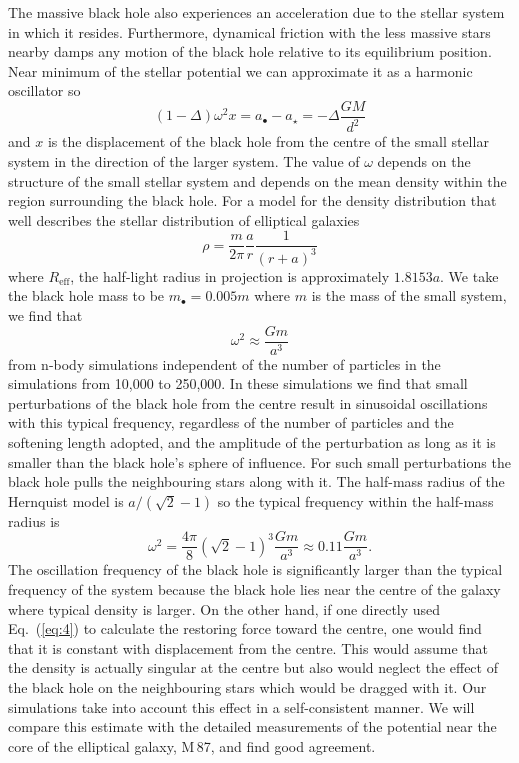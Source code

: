 \documentclass[useAMS,usenatbib]{mn2e}
\begin{document}
The massive black hole also experiences an acceleration due to the
stellar system in which it resides.  Furthermore, dynamical friction
with the less massive stars nearby damps any motion of the black hole
relative to its equilibrium position.  Near minimum of the stellar
potential we can approximate it as a harmonic oscillator so
\begin{equation}
  \left (1 - \Delta \right) \omega^2 x
   = a_\bullet - a_\star = -\Delta \frac{GM}{d^2}
  \label{eq:3}
\end{equation}
and $x$ is the displacement of the black hole from the centre of the
small stellar system in the direction of the larger system.  The value
of $\omega$ depends on the structure of the small stellar system and
depends on the mean density within the region surrounding the black
hole.  For a \citet{1990ApJ...356..359H} model
for the density distribution that well describes the stellar
distribution of elliptical galaxies
\begin{equation}
  \rho = \frac{m}{2\pi} \frac{a}{r} \frac{1}{(r+a)^3}
  \label{eq:4}
\end{equation}
where $R_\mathrm{eff}$, the half-light radius in projection is
approximately $1.8153 a$.  We take the black hole mass to be
$m_\bullet = 0.005 m$ where $m$ is the mass of the small system, we
find that
\begin{equation}
  \omega^2 \approx \frac{Gm}{a^3}
  \label{eq:5}
\end{equation}
from n-body simulations independent of the number of particles in the
simulations from 10,000 to 250,000.  In these simulations we find that
small perturbations of the black hole from the centre result in
sinusoidal oscillations with this typical frequency, regardless of the
number of particles and the softening length adopted, and the
amplitude of the perturbation as long as it is smaller than the black
hole's sphere of influence.  For such small perturbations the black
hole pulls the neighbouring stars along with it. The half-mass radius
of the Hernquist model is $a/(\sqrt{2}-1)$ so the typical frequency
within the half-mass radius is
\begin{equation}
  \omega^2 = \frac{4\pi}{8} (\sqrt{2}-1)^3 \frac{G m}{a^3} \approx
  0.11 \frac{Gm}{a^3}.
  \label{eq:6}
\end{equation}
The oscillation frequency of the black hole is significantly larger
than the typical frequency of the system because the black hole lies
near the centre of the galaxy where typical density is larger.  On the
other hand, if one directly used Eq.~(\ref{eq:4}) to calculate the
restoring force toward the centre, one would find that it is constant
with displacement from the centre.  
This would assume that the density
is actually singular at the centre but also 
would neglect the effect
of the black hole on the neighbouring stars which would be dragged
with it.  
Our simulations take into account this effect in a self-consistent
manner.
We will compare this estimate with the detailed
measurements of the potential near the core of the elliptical galaxy,
M\,87, and find good agreement.
\end{document}
